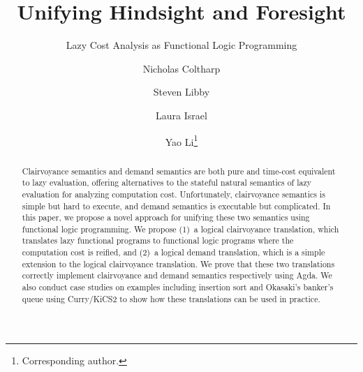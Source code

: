\documentclass[runningheads]{llncs}
\begin{document}
\sloppy

\title{Unifying Hindsight and Foresight}
\subtitle{Lazy Cost Analysis as Functional Logic Programming}

\author{Nicholas Coltharp \and Steven Libby \and Laura
  Israel \and Yao Li\thanks{Corresponding author.}}


\ifmainpaper

  \maketitle

  \begin{abstract}
    Clairvoyance semantics and demand semantics are both pure and time-cost
    equivalent to lazy evaluation, offering alternatives to the stateful natural
    semantics of lazy evaluation for analyzing computation cost. Unfortunately,
    clairvoyance semantics is simple but hard to execute, and demand semantics
    is executable but complicated. In this paper, we propose a novel approach
    for unifying these two semantics using functional logic programming. We
    propose (1)~a logical clairvoyance translation, which translates lazy
    functional programs to functional logic programs where the computation cost
    is reified, and (2)~a logical demand translation, which is a simple
    extension to the logical clairvoyance translation. We prove that these two
    translations correctly implement clairvoyance and demand semantics
    respectively using Agda. We also conduct case studies on examples including
    insertion sort and Okasaki's banker's queue using Curry/KiCS2 to show how
    these translations can be used in practice.

  \end{abstract}

  


  

  

  

  
\end{document}

